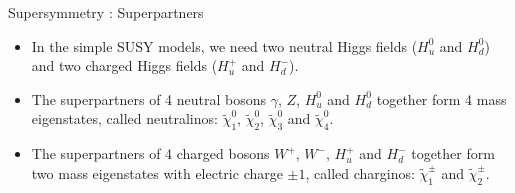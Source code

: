 \documentclass[mathserif,serif]{beamer}
\begin{document}
\begin{frame}{Supersymmetry : Superpartners}
\begin{itemize}
\item In the simple SUSY models, we need two neutral Higgs fields ($H^0_u$ and $H^0_d$) and two charged Higgs fields ($H^+_u$ and $H^-_d$).
\item The superpartners of 4 neutral bosons $\gamma$, $Z$, $H^0_u$ and $H^0_d$ together form 4 mass eigenstates, called neutralinos: $\tilde{\chi}_1^0$, $\tilde{\chi}_2^0$, $\tilde{\chi}_3^0$ and $\tilde{\chi}_4^0$.
\item The superpartners of 4 charged bosons $W^+$, $W^-$, $H^+_u$ and $H^-_d$ together form two mass eigenstates with electric charge $\pm 1$, called charginos: $\tilde{\chi}_1^\pm$ and $\tilde{\chi}_2^\pm$.
\end{itemize}

\begin{table}[htbp]
\tiny
\centering
{}
\caption{\scriptsize The spin and R-parity for the Standard Model particles and their superpartners.}
\end{table}

\end{frame}
\end{document}

